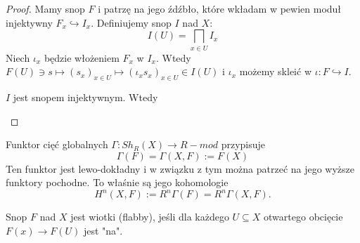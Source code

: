 \begin{proof}
  Mamy snop $F$ i patrzę na jego źdźbło, które wkładam w pewien moduł injektywny $F_x\hookrightarrow I_x$. Definiujemy snop $I$ nad $X$:
  $$I(U)=\bigsqcap_{x\in U}I_x$$
  Niech $\iota_x$ będzie włożeniem $F_x$ w $I_x$. Wtedy $F(U)\ni s\mapsto (s_x)_{x\in U}\mapsto (\iota_x s_x)_{x\in U}\in I(U)$ i $\iota_x$ możemy skleić w $\iota:F\hookrightarrow I$.

  $I$ jest snopem injektywnym. Wtedy 
  \begin{center}\end{center}

  \begin{center}\end{center}

  \begin{center}\end{center}
\end{proof}

\begin{definition} 
  Funktor cięć globalnych $\Gamma:Sh_R(X)\to R-mod$ przypisuje
  $$\Gamma(F)=\Gamma(X, F):=F(X)$$
  Ten funktor jest lewo-dokładny i w związku z tym można patrzeć na jego wyższe funktory pochodne. To właśnie są jego kohomologie
  $$H^n(X, F):=R^n\Gamma(F)=R^n\Gamma(X, F).$$
\end{definition}

\begin{definition}
  Snop $F$ nad $X$ jest wiotki (flabby), jeśli dla każdego $U\subseteq X$ otwartego obcięcie $F(x)\to F(U)$ jest "na".
\end{definition}

